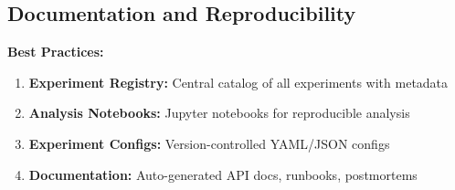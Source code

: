 \subsection{Documentation and Reproducibility}

\textbf{Best Practices:}

\begin{enumerate}
    \item \textbf{Experiment Registry:} Central catalog of all experiments with metadata
    \item \textbf{Analysis Notebooks:} Jupyter notebooks for reproducible analysis
    \item \textbf{Experiment Configs:} Version-controlled YAML/JSON configs
    \item \textbf{Documentation:} Auto-generated API docs, runbooks, postmortems
\end{enumerate}

